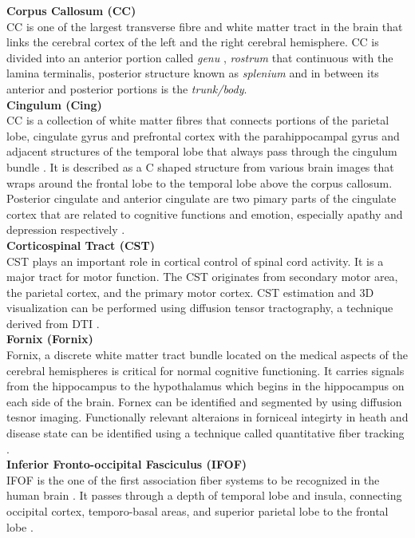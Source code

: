 \documentclass[../structure.tex]{subfiles}
\begin{document}
	\textbf{Corpus Callosum (CC)} \\
	CC is one of the largest transverse fibre and white matter tract in the brain that links the cerebral cortex of the left and the right cerebral hemisphere. CC is divided into an anterior portion called \textit{genu} , \textit{rostrum} that continuous with the lamina terminalis, posterior structure known as \textit{splenium} and in between its anterior and posterior portions is the \textit{trunk/body}.\\


		\textbf{Cingulum (Cing)}  \\
		CC is a collection of white matter fibres that connects portions of the parietal lobe, cingulate gyrus and prefrontal cortex with the parahippocampal gyrus and adjacent structures of the temporal lobe that always pass through the cingulum bundle  \cite{Washington1994}. It is described as a C shaped structure from various brain images that wraps around the frontal lobe to the temporal lobe above the corpus callosum. Posterior cingulate and anterior cingulate are two pimary parts of the cingulate cortex that are related to cognitive functions and emotion,  especially apathy and depression respectively \cite{JaredTanner2010}.\\
		
		
	\textbf{Corticospinal Tract (CST)} \\	
		CST plays an important role in cortical control of spinal cord activity. It is a major tract for motor function. The CST originates from secondary motor area, the parietal cortex, and the primary motor cortex. CST estimation and 3D visualization can be performed using diffusion tensor tractography, a technique derived from DTI \cite{Seo2013}.\\
		
		
		\textbf{Fornix (Fornix)} \\		
	Fornix, a discrete white matter tract bundle located on the medical aspects of the cerebral hemispheres is critical for normal cognitive functioning. It carries signals from the hippocampus to the hypothalamus which begins in the hippocampus on each side of the brain. Fornex can be identified and segmented by using diffusion tesnor imaging. Functionally relevant alteraions in forniceal integirty in heath and disease state can be identified using a technique called quantitative fiber tracking \cite{Thomas2011}.\\

	
		\textbf{Inferior Fronto-occipital Fasciculus (IFOF)} \\		
		IFOF is the one of the first association fiber systems to be recognized in the human brain \cite{Wu2016}. It passes through a depth of temporal lobe and insula, connecting occipital cortex, temporo-basal areas, and superior parietal lobe to the frontal lobe \cite{PDD2015} . \\
\end{document}
